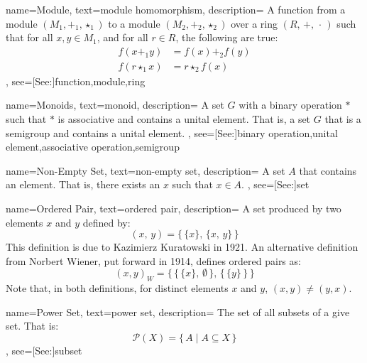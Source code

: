{
    name={Module},
    text={module homomorphism},
    description={
        A function from a module $(M_{1},\boldsymbol{+}_{1},\star_{1})$
        to a module $(M_{2},\boldsymbol{+}_{2},\star_{2})$ over a ring
        $(R,\,+,\,\cdot\,)$ such that for all $x,y\in{M}_{1}$, and for all
        $r\in{R}$, the following are true:
        {%
            \begin{align*}
                f(x\boldsymbol{+}_{1}y)&=f(x)\boldsymbol{+}_{2}f(y)\\
                f(r\star_{1}{x})&=r\star_{2}f(x)
            \end{align*}
        }
    },
    see=[See:]{function,module,ring}
}

{
    name={Monoids},
    text={monoid},
    description={
        A set $G$ with a binary operation $*$ such that $*$ is associative and
        contains a unital element. That is, a set $G$ that is a semigroup and
        contains a unital element.
    },
    see=[See:]{binary operation,unital element,associative operation,semigroup}
}

{
    name={Non-Empty Set},
    text={non-empty set},
    description={
        A set $A$ that contains an element. That is, there exists an $x$
        such that $x\in{A}$.
    },
    see=[See:]{set}
}

{
    name={Ordered Pair},
    text={ordered pair},
    description={
        A set produced by two elements $x$ and $y$ defined by:
        \begin{equation*}
            (x,\,y)=\big\{\,\{x\},\,\{x,\,y\}\,\big\}
        \end{equation*}
        This definition is due to Kazimierz Kuratowski in 1921. An alternative
        definition from Norbert Wiener, put forward in 1914, defines ordered
        pairs as:
        \begin{equation*}
            (x,y)_{W}=\Big\{\,\big\{\,\{x\},\,\emptyset\,\big\},
                            \,\big\{\,\{y\}\,\big\}\,\Big\}
        \end{equation*}
        Note that, in both definitions, for distinct elements $x$ and $y$,
        $(x,y)\ne(y,x)$.
    }
}

{
    name={Power Set},
    text={power set},
    description={
        The set of all subsets of a give set. That is:
        \begin{equation*}
            \mathcal{P}(X)=\{\,A\;|\;A\subseteq{X}\,\}
        \end{equation*}
    },
    see=[See:]{subset}
}

